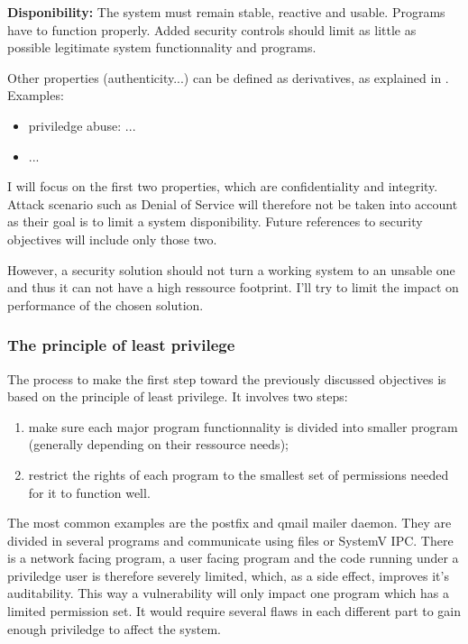 \documentclass[pdftex,a4paper,titlepage,11pt]{article}
\begin{document}
\medskip

\textbf{Disponibility:}
The system must remain stable, reactive and usable. Programs have to function properly. Added security controls should limit as little as possible legitimate system functionnality and programs.

\bigskip

Other properties (authenticity...) can be defined as derivatives, as explained in \cite{THESEBRIFFAUT}. Examples:
\begin{itemize}
	\item priviledge abuse: ...
	\item ... %
\end{itemize}

\smallskip

I will focus on the first two properties, which are confidentiality and integrity. Attack scenario such as Denial of Service will therefore not be taken into account as their goal is to limit a system disponibility. Future references to security objectives will include only those two.

\bigskip

However, a security solution should not turn a working system to an unsable one and thus it can not have a high ressource footprint. I'll try to limit the impact on performance of the chosen solution.

\subsubsection{The principle of least privilege}

The process to make the first step toward the previously discussed objectives is based on the principle of least privilege. It involves two steps:
\begin{enumerate}
	\item make sure each major program functionnality is divided into smaller program (generally depending on their ressource needs);
	\item restrict the rights of each program to the smallest set of permissions needed for it to function well.
\end{enumerate}

\smallskip

The most common examples are the postfix and qmail mailer daemon. They are divided in several programs and communicate using files or SystemV IPC. There is a network facing program, a user facing program and the code running under a priviledge user is therefore severely limited, which, as a side effect, improves it's auditability. This way a vulnerability will only impact one program which has a limited permission set. It would require several flaws in each different part to gain enough priviledge to affect the system.
\end{document}
